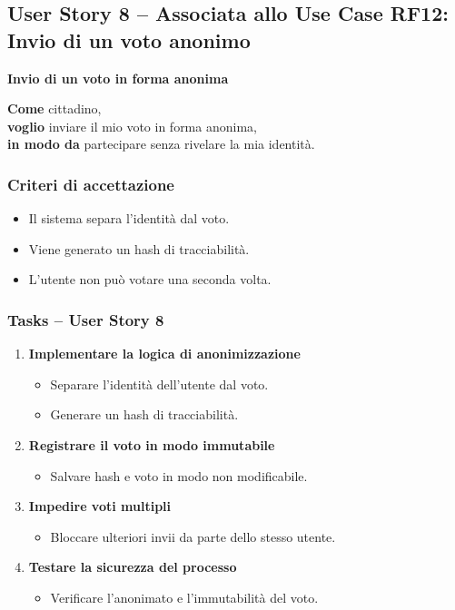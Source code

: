 \documentclass{article}
\begin{document}

\subsection{User Story 8 -- Associata allo Use Case RF12: Invio di un voto anonimo}

\textbf{Invio di un voto in forma anonima}

\textbf{Come} cittadino,\\
\textbf{voglio} inviare il mio voto in forma anonima,\\
\textbf{in modo da} partecipare senza rivelare la mia identità.

\subsubsection{Criteri di accettazione}
\begin{itemize}
    \item Il sistema separa l’identità dal voto.
    \item Viene generato un hash di tracciabilità.
    \item L’utente non può votare una seconda volta.
\end{itemize}

\subsubsection{Tasks -- User Story 8}
\begin{enumerate}
    \item \textbf{Implementare la logica di anonimizzazione}
    \begin{itemize}
        \item Separare l'identità dell'utente dal voto.
        \item Generare un hash di tracciabilità.
    \end{itemize}

    \item \textbf{Registrare il voto in modo immutabile}
    \begin{itemize}
        \item Salvare hash e voto in modo non modificabile.
    \end{itemize}

    \item \textbf{Impedire voti multipli}
    \begin{itemize}
        \item Bloccare ulteriori invii da parte dello stesso utente.
    \end{itemize}

    \item \textbf{Testare la sicurezza del processo}
    \begin{itemize}
        \item Verificare l'anonimato e l'immutabilità del voto.
    \end{itemize}
\end{enumerate}
\end{document}
